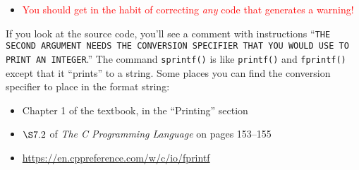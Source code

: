 \begin{description}
    \begin{itemize}
        \item \textcolor{red}{You should get in the habit of correcting \textit{any} code that generates a warning!}
    \end{itemize}
\end{description}
If you look at the source code, you'll see a comment with instructions ``\texttt{THE SECOND ARGUMENT NEEDS THE CONVERSION SPECIFIER THAT YOU WOULD USE TO PRINT AN INTEGER}.''
The command \lstinline{sprintf()} is like \lstinline{printf()} and \lstinline{fprintf()} except that it ``prints'' to a string.
Some places you can find the conversion specifier to place in the format string:
\begin{itemize}
    \item Chapter 1 of the textbook, in the ``Printing'' section
    \item $\S7.2$ of \textit{The C Programming Language} on pages 153--155
    \item \url{https://en.cppreference.com/w/c/io/fprintf}
\end{itemize}



